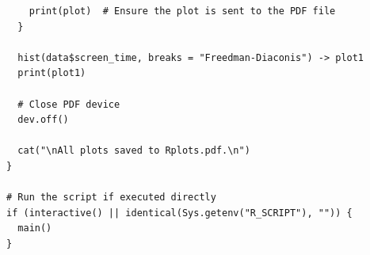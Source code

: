\documentclass{article}
\theoremstyle{mytheoremstyle}
\theoremstyle{mytheoremstyle}
\theoremstyle{myproblemstyle}
\begin{document}
\begin{lstlisting}
    print(plot)  # Ensure the plot is sent to the PDF file
  }

  hist(data$screen_time, breaks = "Freedman-Diaconis") -> plot1
  print(plot1)
  
  # Close PDF device
  dev.off()
  
  cat("\nAll plots saved to Rplots.pdf.\n")
}

# Run the script if executed directly
if (interactive() || identical(Sys.getenv("R_SCRIPT"), "")) {
  main()
}
\end{lstlisting}


  
\end{document}
